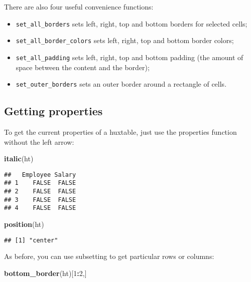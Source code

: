 \documentclass[]{article}
\newenvironment{Shaded}{\begin{snugshade}}{\end{snugshade}}
\newcommand{\KeywordTok}[1]{\textcolor[rgb]{0.13,0.29,0.53}{\textbf{#1}}}
\newcommand{\DecValTok}[1]{\textcolor[rgb]{0.00,0.00,0.81}{#1}}
\newcommand{\OperatorTok}[1]{\textcolor[rgb]{0.81,0.36,0.00}{\textbf{#1}}}
\newcommand{\NormalTok}[1]{#1}
\providecommand{\tightlist}{%
  \setlength{\itemsep}{0pt}\setlength{\parskip}{0pt}}
\begin{document}
There are also four useful convenience functions:

\begin{itemize}
\tightlist
\item
  \texttt{set\_all\_borders} sets left, right, top and bottom borders
  for selected cells;
\item
  \texttt{set\_all\_border\_colors} sets left, right, top and bottom
  border colors;
\item
  \texttt{set\_all\_padding} sets left, right, top and bottom padding
  (the amount of space between the content and the border);
\item
  \texttt{set\_outer\_borders} sets an outer border around a rectangle
  of cells.
\end{itemize}

\subsection{Getting properties}\label{getting-properties}

To get the current properties of a huxtable, just use the properties
function without the left arrow:

\begin{Shaded}
\begin{Highlighting}[]
\KeywordTok{italic}\NormalTok{(ht)}
\end{Highlighting}
\end{Shaded}

\begin{verbatim}
##   Employee Salary
## 1    FALSE  FALSE
## 2    FALSE  FALSE
## 3    FALSE  FALSE
## 4    FALSE  FALSE
\end{verbatim}

\begin{Shaded}
\begin{Highlighting}[]
\KeywordTok{position}\NormalTok{(ht)}
\end{Highlighting}
\end{Shaded}

\begin{verbatim}
## [1] "center"
\end{verbatim}

\FloatBarrier

As before, you can use subsetting to get particular rows or columns:

\begin{Shaded}
\begin{Highlighting}[]
\KeywordTok{bottom_border}\NormalTok{(ht)[}\DecValTok{1}\OperatorTok{:}\DecValTok{2}\NormalTok{,]}
\end{Highlighting}
\end{Shaded}
\end{document}
